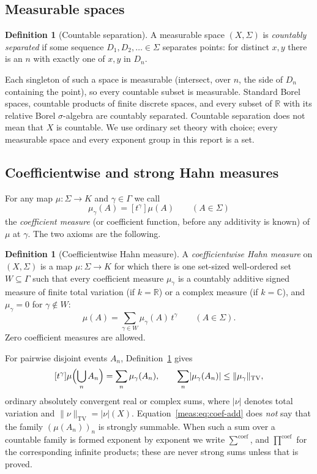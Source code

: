 \documentclass[11pt]{article}
\numberwithin{equation}{section}
\theoremstyle{definition}
\newtheorem{definition}[theorem]{Definition}
\theoremstyle{remark}
\newcommand{\R}{\mathbb R}
\newcommand{\C}{\mathbb C}
\newcommand{\TV}{\mathrm{TV}}
\newcommand{\coef}[2]{[t^{#1}]#2}
\newcommand{\csum}{\mathop{\sum}\nolimits^{\mathrm{coef}}}
\newcommand{\cprod}{\mathop{\prod}\nolimits^{\mathrm{coef}}}
\newcommand{\norm}[1]{\lVert#1\rVert}
\newcommand{\abs}[1]{\lvert#1\rvert}
\begin{document}
\subsection{Measurable spaces}\label{meas:sub:spaces}

\begin{definition}[Countable separation]\label{meas:def:separated}
A measurable space $(X,\Sigma)$ is \emph{countably separated} if some sequence
$D_1,D_2,\ldots\in\Sigma$ separates points: for distinct $x,y$ there is an $n$
with exactly one of $x,y$ in $D_n$.
\end{definition}

Each singleton of such a space is measurable (intersect, over $n$, the side of
$D_n$ containing the point), so every countable subset is measurable. Standard
Borel spaces, countable products of finite discrete spaces, and every subset
of $\R$ with its relative Borel $\sigma$-algebra are countably separated.
Countable separation does not mean that $X$ is countable. We use ordinary set
theory with choice; every measurable space and every exponent group in this
report is a set.

\subsection{Coefficientwise and strong Hahn measures}\label{meas:sub:axioms}

For any map $\mu:\Sigma\to K$ and $\gamma\in\Gamma$ we call
\[
 \mu_\gamma(A)=\coef{\gamma}{\mu(A)}\qquad(A\in\Sigma)
\]
the \emph{coefficient measure} (or coefficient function, before any additivity
is known) of $\mu$ at $\gamma$. The two axioms are the following.

\begin{definition}[Coefficientwise Hahn measure]\label{meas:def:coefficientwise}
A \emph{coefficientwise Hahn measure} on $(X,\Sigma)$ is a map
$\mu:\Sigma\to K$ for which there is one set-sized well-ordered set
$W\subseteq\Gamma$ such that every coefficient measure $\mu_\gamma$ is a
countably additive signed measure of finite total variation (if $k=\R$) or a
complex measure (if $k=\C$), and $\mu_\gamma=0$ for $\gamma\notin W$:
\begin{equation}\label{meas:eq:coef-measure}
 \mu(A)=\sum_{\gamma\in W}\mu_\gamma(A)\,t^\gamma\qquad(A\in\Sigma).
\end{equation}
Zero coefficient measures are allowed.
\end{definition}

For pairwise disjoint events $A_n$, Definition~\ref{meas:def:coefficientwise}
gives
\begin{equation}\label{meas:eq:coef-add}
 \coef{\gamma}{\mu\Bigl(\bigcup_n A_n\Bigr)}=\sum_n\mu_\gamma(A_n),\qquad
 \sum_n\abs{\mu_\gamma(A_n)}\le\norm{\mu_\gamma}_{\TV},
\end{equation}
ordinary absolutely convergent real or complex sums, where $\abs{\nu}$ denotes
total variation and $\norm{\nu}_\TV=\abs{\nu}(X)$. Equation~\eqref{meas:eq:coef-add}
does \emph{not} say that the family $(\mu(A_n))_n$ is strongly summable. When
such a sum over a countable family is formed exponent by exponent we write
$\csum$, and $\cprod$ for the corresponding infinite products; these are
never strong sums unless that is proved.
\end{document}
